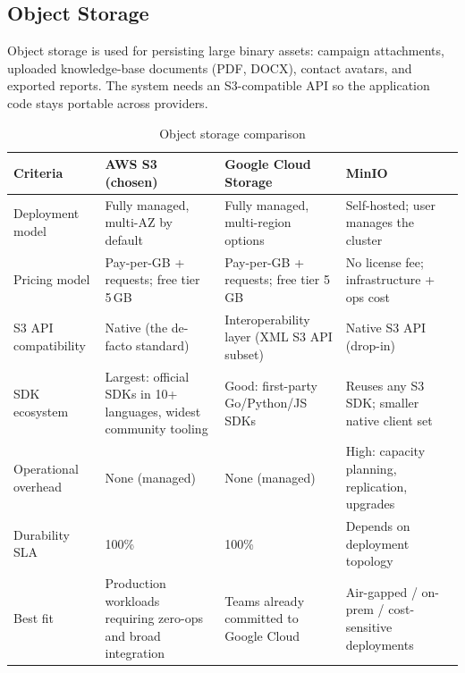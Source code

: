 \documentclass[a4paper]{article}
\begin{document}
\subsection{Object Storage}

Object storage is used for persisting large binary assets:
campaign attachments, uploaded knowledge-base documents (PDF,
DOCX), contact avatars, and exported reports. The system needs an
S3-compatible API so the application code stays portable across
providers.

\begin{table}[H]
\centering
\caption{Object storage comparison}
\label{tab:object-storage-comparison}
\begin{tabular}{|p{3.2cm}|p{3.6cm}|p{3.6cm}|p{3.6cm}|}
\hline
\textbf{Criteria} & \textbf{AWS S3 (chosen)} & \textbf{Google Cloud Storage} & \textbf{MinIO} \\
\hline
Deployment model & Fully managed, multi-AZ by default & Fully managed, multi-region options & Self-hosted; user manages the cluster \\
\hline
Pricing model & Pay-per-GB + requests; free tier 5\,GB & Pay-per-GB + requests; free tier 5\,GB & No license fee; infrastructure + ops cost \\
\hline
S3 API compatibility & Native (the de-facto standard) & Interoperability layer (XML S3 API subset) & Native S3 API (drop-in) \\
\hline
SDK ecosystem & Largest: official SDKs in 10+ languages, widest community tooling & Good: first-party Go/Python/JS SDKs & Reuses any S3 SDK; smaller native client set \\
\hline
Operational overhead & None (managed) & None (managed) & High: capacity planning, replication, upgrades \\
\hline
Durability SLA & 100\%  & 100\% & Depends on deployment topology \\
\hline
Best fit & Production workloads requiring zero-ops and broad integration & Teams already committed to Google Cloud & Air-gapped / on-prem / cost-sensitive deployments \\
\hline
\end{tabular}
\end{table}
\end{document}
